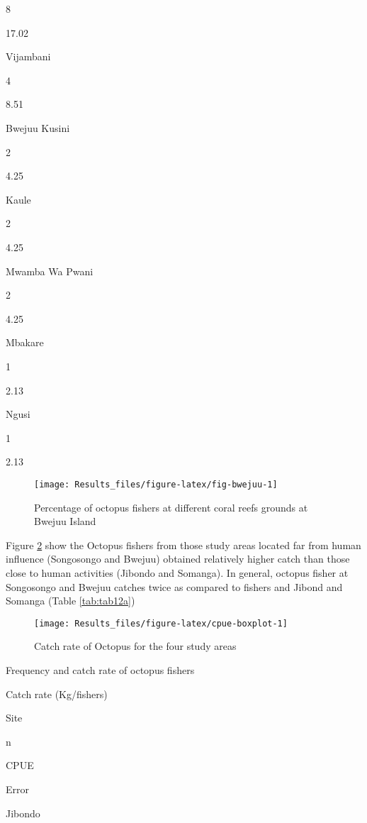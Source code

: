 \documentclass[]{article}
\begin{document}
8

17.02

Vijambani

4

8.51

Bwejuu Kusini

2

4.25

Kaule

2

4.25

Mwamba Wa Pwani

2

4.25

Mbakare

1

2.13

Ngusi

1

2.13

\begin{figure}

{\centering \texttt{[image: Results\_files/figure-latex/fig-bwejuu-1]} 

}

\caption{Percentage of octopus fishers at different coral reefs grounds at Bwejuu Island}\label{fig:fig-bwejuu}
\end{figure}

Figure \ref{fig:cpue-boxplot} show the Octopus fishers from those study
areas located far from human influence (Songosongo and Bwejuu) obtained
relatively higher catch than those close to human activities (Jibondo
and Somanga). In general, octopus fisher at Songosongo and Bwejuu
catches twice as compared to fishers and Jibond and Somanga (Table
\ref{tab:tab12a})

\begin{figure}

{\centering \texttt{[image: Results\_files/figure-latex/cpue-boxplot-1]} 

}

\caption{Catch rate of Octopus for the four study areas}\label{fig:cpue-boxplot}
\end{figure}

\label{tab:tab12a}Frequency and catch rate of octopus fishers

Catch rate (Kg/fishers)

Site

n

CPUE

Error

Jibondo
\end{document}
